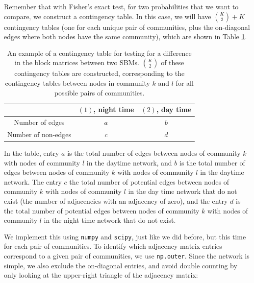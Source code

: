 Remember that with Fisher's exact test, for two probabilities that we want to compare, we construct a contingency table. In this case, we will have $\binom K 2 + K$ contingency tables (one for each unique pair of communities, plus the on-diagonal edges where both nodes have the same community), which are shown in Table \ref{tab:ch8:twosampl_sbm:cont}.

\begin{table}[h]
    \centering
    \begin{tabular}{c|c| c}
         & $(1)$, night time & $(2)$, day time  \\
         \hline
         Number of edges & $a$ & $b$ \\
         Number of non-edges &$c$ & $d$
    \end{tabular}
    \caption[Two-sample SBM contingency table.]{An example of a contingency table for testing for a difference in the block matrices between two SBMs. $\binom K 2$ of these contingency tables are constructed, corresponding to the contingency tables between nodes in community $k$ and $l$ for all possible pairs of communities.}
    \label{tab:ch8:twosampl_sbm:cont}
\end{table}

In the table, entry $a$ is the total number of edges between nodes of community $k$ with nodes of community $l$ in the daytime network, and $b$ is the total number of edges between nodes of community $k$ with nodes of community $l$ in the daytime network. The entry $c$ the total number of potential edges between nodes of community $k$ with nodes of community $l$ in the day time network that do not exist (the number of adjacencies with an adjacency of zero), and the entry $d$ is the total number of potential edges between nodes of community $k$ with nodes of community $l$ in the night time network that do not exist. 

We implement this using \texttt{numpy} and \texttt{scipy}, just like we did before, but this time for each pair of communities. To identify which adjacency matrix entries correspond to a given pair of communities, we use \texttt{np.outer}. Since the network is simple, we also exclude the on-diagonal entries, and avoid double counting by only looking at the upper-right triangle of the adjacency matrix:

